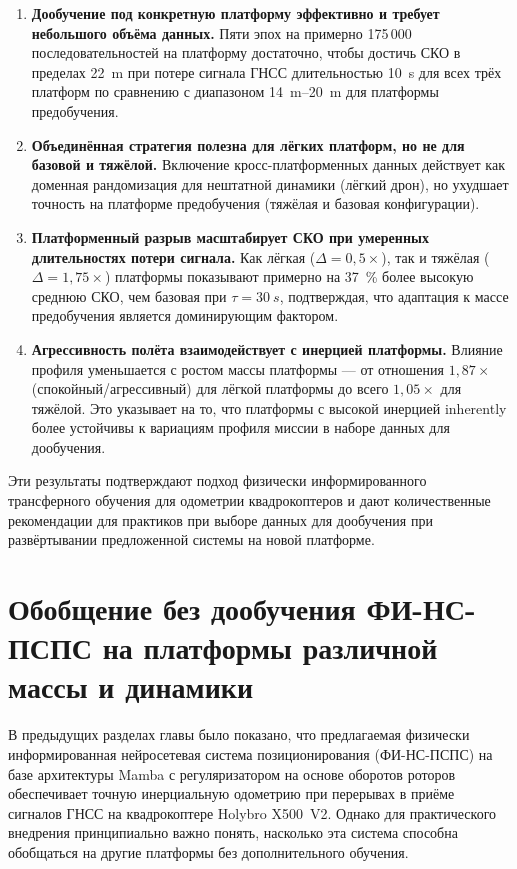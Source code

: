 \begin{enumerate}
	\item \textbf{Дообучение под конкретную платформу эффективно и требует небольшого объёма данных.}
	Пяти эпох на примерно 175\,000 последовательностей на платформу достаточно, чтобы достичь СКО в пределах \SI{22}{m} при потере сигнала ГНСС длительностью \SI{10}{s} для всех трёх платформ по сравнению с диапазоном \SIrange{14}{20}{m} для платформы предобучения.
	\item \textbf{Объединённая стратегия полезна для лёгких платформ, но не для базовой и тяжёлой.}
	Включение кросс-платформенных данных действует как доменная рандомизация для нештатной динамики (лёгкий дрон), но ухудшает точность на платформе предобучения (тяжёлая и базовая конфигурации).
	\item \textbf{Платформенный разрыв масштабирует СКО при умеренных длительностях потери сигнала.}
	Как лёгкая ($\Delta=0{,}5\times$), так и тяжёлая ($\Delta=1{,}75\times$) платформы показывают примерно на 37~\% более высокую среднюю СКО, чем базовая при $\tau=\SI{30}{s}$, подтверждая, что адаптация к массе предобучения является доминирующим фактором.
	\item \textbf{Агрессивность полёта взаимодействует с инерцией платформы.}
	Влияние профиля уменьшается с ростом массы платформы — от отношения $1{,}87\times$ (спокойный/агрессивный) для лёгкой платформы до всего $1{,}05\times$ для тяжёлой. Это указывает на то, что платформы с высокой инерцией inherently более устойчивы к вариациям профиля миссии в наборе данных для дообучения.
\end{enumerate}
	
Эти результаты подтверждают подход физически информированного трансферного обучения для одометрии квадрокоптеров и дают количественные рекомендации для практиков при выборе данных для дообучения при развёртывании предложенной системы на новой платформе.
	
\section{Обобщение без дообучения ФИ-НС-ПСПС на платформы различной массы и динамики}
\label{sec:mp_crossplatform}

В предыдущих разделах главы было показано, что предлагаемая физически информированная нейросетевая система позиционирования (ФИ-НС-ПСПС) на базе архитектуры Mamba с регуляризатором на основе оборотов роторов обеспечивает точную инерциальную одометрию при перерывах в приёме сигналов ГНСС на квадрокоптере Holybro X500~V2. Однако для практического внедрения принципиально важно понять, насколько эта система способна обобщаться на другие платформы без дополнительного обучения. 

